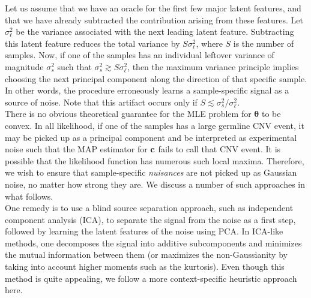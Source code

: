 \documentclass[nofootinbib,amssymb,amsmath]{revtex4}
\newcommand{\vc}{{\bf c}}
\newcommand{\vtheta}{{\boldsymbol \theta}}
\begin{document}
Let us assume that we have an oracle for the first few major latent features, and that we have already subtracted the contribution arising from these features. Let $\sigma_\ell^2$ be the variance associated with the next leading latent feature. Subtracting this latent feature reduces the total variance by $S\sigma_\ell^2$, where $S$ is the number of samples. Now, if one of the samples has an individual leftover variance of magnitude $\sigma_s^2$ such that $\sigma_s^2 \gtrsim S\sigma_\ell^2$, then the maximum variance principle implies choosing the next principal component along the direction of that specific sample. In other words, the procedure erroneously learns a sample-specific signal as a source of noise. Note that this artifact occurs only if $S \lesssim \sigma_s^2 / \sigma_\ell^2$.\\

 There is no obvious theoretical guarantee for the MLE problem for $\vtheta$ to be convex. In all likelihood, if one of the samples has a large germline CNV event, it may be picked up as a principal component and be interpreted as experimental noise such that the MAP estimator for $\vc$ fails to call that CNV event. It is possible that the likelihood function has numerous such local maxima. Therefore, we wish to ensure that sample-specific {\em nuisances} are not picked up as Gaussian noise, no matter how strong they are. We discuss a number of such approaches in what follows.\\

 One remedy is to use a blind source separation approach, such as independent component analysis (ICA), to separate the signal from the noise as a first step, followed by learning the latent features of the noise using PCA. In ICA-like methods, one decomposes the signal into additive subcomponents and minimizes the mutual information between them (or maximizes the non-Gaussianity by taking into account higher moments such as the kurtosis). Even though this method is quite appealing, we follow a more context-specific heuristic approach here.\\
\end{document}
